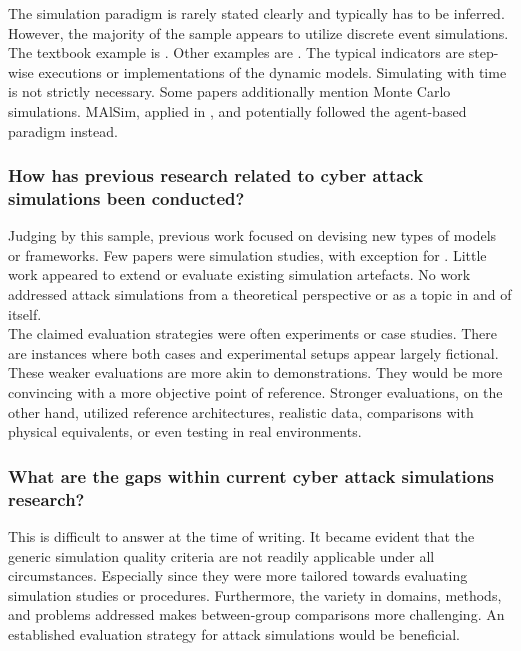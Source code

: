 \documentclass{article}
\begin{document}
\noindent The simulation paradigm is rarely stated clearly and typically has to be inferred. However, the majority of the sample appears to utilize discrete event simulations. The textbook example is \cite{pudar2009}. Other examples are \cite{outkin2019, white2014, konovalov2013, queiroz2011}. The typical indicators are step-wise executions or implementations of the dynamic models. Simulating with time is not strictly necessary. Some papers additionally mention Monte Carlo simulations\cite{outkin2019, liu2016, zhang2016, holm2014}. MAlSim, applied in \cite{leszczyna2011}, and potentially \cite{casey2016} followed the agent-based paradigm instead.

\subsubsection{How has previous research related to cyber attack simulations been conducted?}

Judging by this sample, previous work focused on devising new types of models or frameworks. Few papers were simulation studies, with exception for \cite{konovalov2013}. Little work appeared to extend or evaluate existing simulation artefacts. No work addressed attack simulations from a theoretical perspective or as a topic in and of itself.\\

\noindent The claimed evaluation strategies were often experiments or case studies. There are instances where both cases and experimental setups appear largely fictional\cite{tjoa2010, leszczyna2011, queiroz2011}. These weaker evaluations are more akin to demonstrations. They would be more convincing with a more objective point of reference. Stronger evaluations, on the other hand, utilized reference architectures\cite{liu2016, zhang2016}, realistic data\cite{polatidis2018}, comparisons with physical equivalents\cite{alves2018}, or even testing in real environments\cite{holm2014}.

\subsubsection{What are the gaps within current cyber attack simulations research?}

This is difficult to answer at the time of writing. It became evident that the generic simulation quality criteria are not readily applicable under all circumstances. Especially since they were more tailored towards evaluating simulation studies or procedures. Furthermore, the variety in domains, methods, and problems addressed makes between-group comparisons more challenging. An established evaluation strategy for attack simulations would be beneficial.
\end{document}
